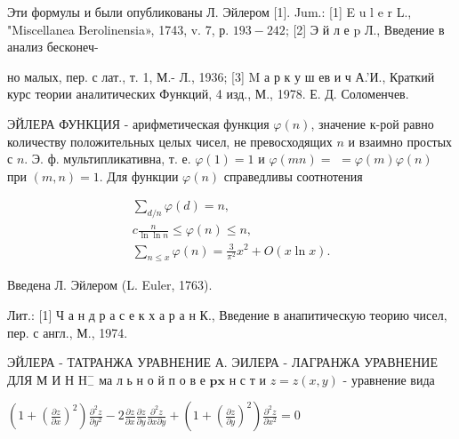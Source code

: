 \documentclass[10pt]{article}
\begin{document}
Эти формулы и были опубликованы Л. Эйлером [1]. Jum.: [1] E u l e r L., "Miscellanea Berolinensia», 1743, v. 7, р. $193-242$; [2] Э й л е p Л., Введение в анализ бесконеч-

но малых, пер. с лат., т. 1, М.- Л., 1936; [3] M а р к у ш ев и ч А.'И., Краткий курс теории аналитических Функций, 4 изд., М., 1978. Е. Д. Соломенчев.



ЭЙЛЕРА ФУНКЦИЯ - арифметическая функция $\varphi(n)$, значение к-рой равно количеству положительных целых чисел, не превосходящих $n$ и взаимно простых с $n$. Э. ф. мультипликативна, т. е. $\varphi(1)=1$ и $\varphi(m n)=$ $=\varphi(m) \varphi(n)$ при $(m, n)=1$. Для функции $\varphi(n)$ справедливы соотнотения



\[

\begin{gathered}

\sum_{d / n} \varphi(d)=n, \\

c \frac{n}{\ln \ln n} \leqslant \varphi(n) \leqslant n, \\

\sum_{n \leqslant x} \varphi(n)=\frac{3}{\pi^{2}} x^{2}+O(x \ln x) .

\end{gathered}

\]



Введена Л. Эйлером (L. Euler, 1763).



Лит.: [1] Ч а н д р а с е к х а р а н К., Введение в анапитическую теорию чисел, пер. с англ., М., 1974.



ЭЙЛЕРА - ТАТРАНЖА УРАВНЕНИЕ А. ЭИЛЕРА - ЛАГРАНЖА УРАВНЕНИЕ ДЛЯ М И Н $\mathrm{H}_{-}^{-}$ ма л ь н о й п о в е $\mathbf{p} \mathbf{x}$ н с т и $z=z(x, y)$ - уравнение вида



$\left(1+\left(\frac{\partial z}{\partial x}\right)^{2}\right) \frac{\partial^{2} z}{\partial y^{2}}-2 \frac{\partial z}{\partial x} \frac{\partial z}{\partial y} \frac{\partial^{2} z}{\partial x \partial y}+\left(1+\left(\frac{\partial z}{\partial y}\right)^{2}\right) \frac{\partial^{2} z}{\partial x^{2}}=0$
\end{document}
